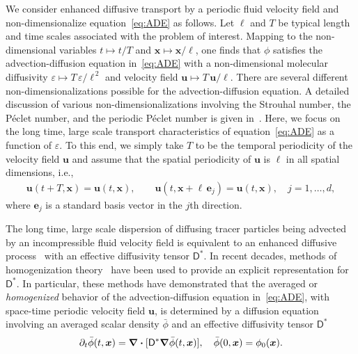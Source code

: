 \documentclass[leqno,onefignum,onetabnum]{siamltex1213}
\newcommand{\Dm}{\mathsf{D}}
\newcommand\bnabla{\mbox{\boldmath${\nabla}$}}
\providecommand\bcdot{\boldsymbol{\cdot}}
\newcommand{\vecx}{\boldsymbol{x}}
\newcommand{\vecu}{\boldsymbol{u}}
\newcommand{\vece}{\boldsymbol{e}}
\begin{document}
We consider enhanced diffusive transport by a periodic fluid velocity
field and non-dimensionalize equation~\eqref{eq:ADE} as follows. Let
$\ell$ and $T$ be typical length and time scales associated with the
problem of interest. Mapping to the non-dimensional variables
$t\mapsto t/T$ and $\vecx\mapsto \vecx/\ell$,
one finds that $\phi$ satisfies the advection-diffusion equation
in~\eqref{eq:ADE} with a non-dimensional molecular diffusivity 
$\varepsilon\mapsto T\,\varepsilon/\ell^{\,2}$ and velocity field $\vecu\mapsto T\,\vecu /\ell$. There are
several different non-dimensionalizations possible 
for the advection-diffusion equation. A detailed discussion of 
various non-dimensionalizations involving the Strouhal number, the
P\'{e}clet number, and the periodic P\'{e}clet number is given
in~\cite{McLaughlin:Forest:PF:1999:880,Majda:Kramer:1999:book}.  Here,
we focus on the long time, large scale transport characteristics of
equation~\eqref{eq:ADE} as a function of $\varepsilon$. To this end, we simply
take $T$ to be the temporal periodicity of the velocity field $\vecu$
and assume that the spatial periodicity of $\vecu$ is $\ell$ in all
spatial dimensions, i.e., 
%
\begin{align}\label{eq:Periodic_u}
  \vecu(t+T,\vecx)=\vecu(t,\vecx), \qquad
  \vecu(t,\vecx+\ell\,\vece_j)=\vecu(t,\vecx), \quad
  j=1,\ldots,d,
\end{align}
%
where $\vece_j$ is a standard basis vector in the $j$th direction. 




The long time, large scale dispersion of diffusing tracer particles
being advected by an incompressible fluid velocity field is equivalent
to an enhanced diffusive process~\cite{Taylor:PRSL:196} with an
effective diffusivity tensor $\Dm^*$. In recent decades, methods of
homogenization
theory~\cite{McLaughlin:SIAM_JAM:780,Fannjiang:1994:SIAM_JAM:333,Majda:Kramer:1999:book}
have been used to provide an explicit representation for
$\Dm^*$. In particular, these methods have demonstrated that the
averaged or \emph{homogenized} behavior of the advection-diffusion
equation in~\eqref{eq:ADE}, with space-time periodic velocity field
$\vecu$, is determined by a diffusion equation
involving an averaged scalar density $\bar{\phi}$ and an
effective diffusivity tensor
$\Dm^*$~\cite{Majda:Kramer:1999:book}       
%
\begin{align}\label{eq:phi_bar}
 \partial_t\bar{\phi}(t,\vecx)=\bnabla\bcdot[\Dm^*\bnabla \bar{\phi}(t,\vecx)], \quad
  \bar{\phi}(0,\vecx)=\phi_0(\vecx).
\end{align}
\end{document}
